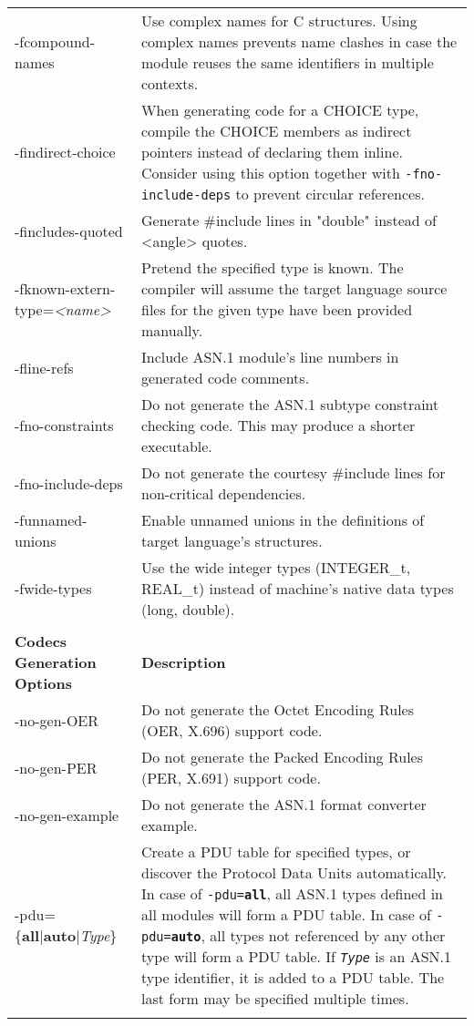 \documentclass[english,oneside,12pt]{book}
\begin{document}
\begin{longtable}{lp{4in}}
{\ttfamily -fcompound-names} & {\small Use complex names for C structures. Using complex names prevents
name clashes in case the module reuses the same identifiers in multiple
contexts.}\\
{\ttfamily -findirect-choice} & {\small When generating code for a CHOICE type, compile the CHOICE
members as indirect pointers instead of declaring them inline. Consider
using this option together with \texttt{-fno-include-deps}
to prevent circular references.}\\
{\ttfamily -fincludes-quoted} & {\small Generate \#include lines in "double" instead of <angle> quotes.}\\
{\ttfamily -fknown-extern-type=\emph{<name>}} & {\small Pretend the specified type is known. The compiler will assume
the target language source files for the given type have been provided
manually. }\\
{\ttfamily -fline-refs} & {\small Include ASN.1 module's line numbers in generated code comments.}\\
{\ttfamily -fno-constraints} & {\small Do not generate the ASN.1 subtype constraint checking code. This
may produce a shorter executable.}\\
{\ttfamily -fno-include-deps} & {\small Do not generate the courtesy \#include lines for non-critical dependencies.}\\
{\ttfamily -funnamed-unions} & {\small Enable  unnamed  unions in the definitions of target language's structures.}\\
{\ttfamily -fwide-types} & {\small Use the wide integer types (INTEGER\_t, REAL\_t) instead of machine's native data types (long, double). }\\\\
\textbf{Codecs Generation Options} & \textbf{Description}\\
\midrule
{\ttfamily -no-gen-OER} & {\small Do not generate the Octet Encoding Rules (OER, X.696) support code.}\\
{\ttfamily -no-gen-PER} & {\small Do not generate the Packed Encoding Rules (PER, X.691) support code.}\\
{\ttfamily -no-gen-example} & {\small Do not generate the ASN.1 format converter example.}\\
{\ttfamily -pdu=\{\textbf{all}|\textbf{auto}|\emph{Type}\}} & {\small Create a PDU table for specified types, or discover the Protocol Data Units automatically.
In case of \texttt{-pdu=\textbf{all}}, all ASN.1 types defined in all modules will form a PDU table. In case of \texttt{-pdu=\textbf{auto}}, all types not referenced by any other type will form a PDU table. If \texttt{\emph{Type}} is an ASN.1 type identifier, it is added to a PDU table. The last form may be specified multiple times.}\\ \\

\end{longtable}
\end{document}
